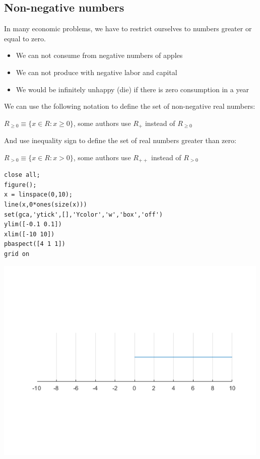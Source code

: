 \documentclass[
]{book}
\begin{document}
\hypertarget{non-negative-numbers}{%
\subsection{Non-negative numbers}\label{non-negative-numbers}}

In many economic problems, we have to restrict ourselves to numbers
greater or equal to zero.

\begin{itemize}
\item
  We can not consume from negative numbers of apples
\item
  We can not produce with negative labor and capital
\item
  We would be infinitely unhappy (die) if there is zero consumption in
  a year
\end{itemize}

We can use the following notation to define the set of non-negative real
numbers:

\({R_{\ge 0} }\equiv \lbrace x\in R:x\ge 0\rbrace\), some authors use
\({R_+ }\) instead of \({R_{\ge 0} }\)

And use inequality sign to define the set of real numbers greater than
zero:

\({R_{>0} }\equiv \lbrace x\in R:x>0\rbrace\), some authors use
\({R_{++} }\) instead of \({R_{>0} }\)

\begin{verbatim}
close all;
figure();
x = linspace(0,10);
line(x,0*ones(size(x)))
set(gca,'ytick',[],'Ycolor','w','box','off')
ylim([-0.1 0.1])
xlim([-10 10])
pbaspect([4 1 1])
grid on
\end{verbatim}

\includegraphics[width=5.20833in,height=\textheight]{img/realnumber_images/figure_1.png}
\end{document}
